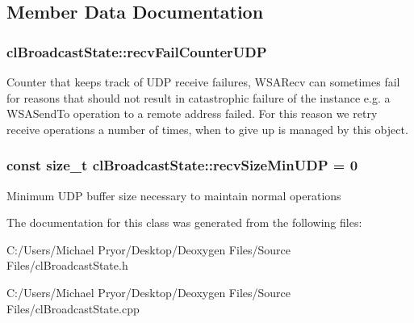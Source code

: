 \subsection{Member Data Documentation}
\hypertarget{classcl_broadcast_state_ae1a39353704b20addef1fc686557bc80}{
\subsubsection[{recvFailCounterUDP}]{ {\bf clBroadcastState::recvFailCounterUDP}}}
\label{classcl_broadcast_state_ae1a39353704b20addef1fc686557bc80}
Counter that keeps track of UDP receive failures, WSARecv can sometimes fail for reasons that should not result in catastrophic failure of the instance e.g. a WSASendTo operation to a remote address failed. For this reason we retry receive operations a number of times, when to give up is managed by this object. \hypertarget{classcl_broadcast_state_a68d5adfa849a922c8ae63ec25e884b37}{
\subsubsection[{recvSizeMinUDP}]{\setlength{\rightskip}{0pt plus 5cm}const size\_\-t {\bf clBroadcastState::recvSizeMinUDP} = 0}}
\label{classcl_broadcast_state_a68d5adfa849a922c8ae63ec25e884b37}
Minimum UDP buffer size necessary to maintain normal operations 

The documentation for this class was generated from the following files:\begin{DoxyCompactItemize}
\item 
C:/Users/Michael Pryor/Desktop/Deoxygen Files/Source Files/clBroadcastState.h\item 
C:/Users/Michael Pryor/Desktop/Deoxygen Files/Source Files/clBroadcastState.cpp\end{DoxyCompactItemize}
